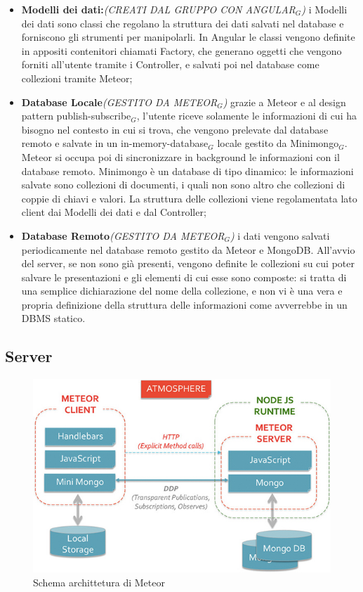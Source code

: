 \begin{itemize}
\item \textbf{Modelli dei dati:}\textit{(CREATI DAL GRUPPO CON ANGULAR$_G$)} i Modelli dei dati sono classi che regolano la struttura dei dati salvati nel database e forniscono gli strumenti per manipolarli. In Angular le classi vengono definite in appositi contenitori chiamati Factory, che generano oggetti che vengono forniti all'utente tramite i Controller, e salvati poi nel database come collezioni tramite Meteor;
\item \textbf{Database Locale}\textit{(GESTITO DA METEOR$_G$)} grazie a Meteor e al design pattern publish-subscribe$_G$, l'utente riceve solamente le informazioni di cui ha bisogno nel contesto in cui si trova, che vengono prelevate dal database remoto e salvate in un in-memory-database$_G$ locale gestito da Minimongo$_G$. Meteor si occupa poi di sincronizzare in background le informazioni con il database remoto. Minimongo è un database di tipo dinamico: le informazioni salvate sono collezioni di documenti, i quali non sono altro che collezioni di coppie di chiavi e valori. La struttura delle collezioni viene regolamentata lato client dai Modelli dei dati e dal Controller;
\item \textbf{Database Remoto}\textit{(GESTITO DA METEOR$_G$)} i dati vengono salvati periodicamente nel database remoto gestito da Meteor e MongoDB. All'avvio del server, se non sono già presenti, vengono definite le collezioni su cui poter salvare le presentazioni e gli elementi di cui esse sono composte: si tratta di una semplice dichiarazione del nome della collezione, e non vi è una vera e propria definizione della struttura delle informazioni come avverrebbe in un DBMS statico.
\end{itemize}



\subsection{Server}

\begin{figure}[H]
\begin{center}
\includegraphics[scale=0.70]{img/meteor_architettura.jpg}
\caption{Schema archittetura di Meteor}
\end{center}
\end{figure}

